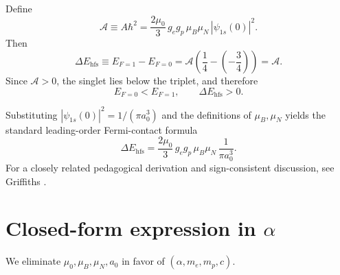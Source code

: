\documentclass[11pt,a4paper]{article}
\begin{document}
            Define
            \begin{equation}
                \mathcal{A}\equiv A\hbar^2
                =
                \frac{2\mu_0}{3}\,g_e g_p\,\mu_B\mu_N\,|\psi_{1s}(0)|^2.
                \label{eq:Acal_def}
            \end{equation}
            Then
            \begin{equation}
                \Delta E_{\mathrm{hfs}}
                \equiv
                E_{F=1}-E_{F=0}
                =
                \mathcal{A}\left(\frac{1}{4}-\left(-\frac{3}{4}\right)\right)
                =
                \mathcal{A}.
                \label{eq:DeltaE_A}
            \end{equation}
            Since $\mathcal{A}>0$, the singlet lies below the triplet, and therefore
            \[
                E_{F=0}<E_{F=1},
                \qquad
                \Delta E_{\mathrm{hfs}}>0.
            \]
            
            Substituting $|\psi_{1s}(0)|^2=1/(\pi a_0^3)$ and the definitions of $\mu_B,\mu_N$ yields the standard leading-order Fermi-contact formula
            \begin{equation}
                \Delta E_{\mathrm{hfs}}
                =
                \frac{2\mu_0}{3}\,g_e g_p\,\mu_B\mu_N\,\frac{1}{\pi a_0^3}.
                \label{eq:DeltaE_SI_form}
            \end{equation}
            For a closely related pedagogical derivation and sign-consistent discussion, see Griffiths \cite{GriffithsAJP1982}.

    \section{Closed-form expression in \texorpdfstring{$\alpha$}{alpha}}
        \label{sec:closedform}
        
        We eliminate $\mu_0,\mu_B,\mu_N,a_0$ in favor of $(\alpha,m_e,m_p,c)$.
        
\end{document}

